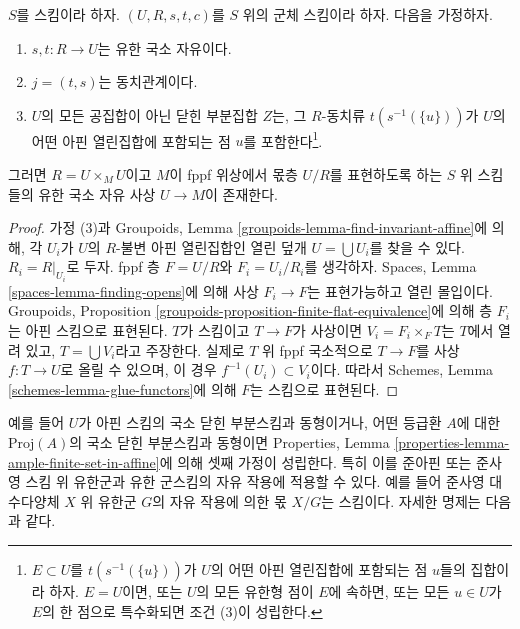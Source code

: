 \begin{proposition}
\label{proposition-finite-flat-equivalence-global}
$S$를 스킴이라 하자.
$(U, R, s, t, c)$를 $S$ 위의 군체 스킴이라 하자.
다음을 가정하자.
\begin{enumerate}
\item $s, t : R \to U$는 유한 국소 자유이다.
\item $j = (t, s)$는 동치관계이다.
\item $U$의 모든 공집합이 아닌 닫힌 부분집합 $Z$는, 그 $R$-동치류
$t(s^{-1}(\{u\}))$가 $U$의 어떤 아핀 열린집합에 포함되는 점 $u$를
포함한다\footnote{$E \subset U$를 $t(s^{-1}(\{u\}))$가 $U$의 어떤
아핀 열린집합에 포함되는 점 $u$들의 집합이라 하자. $E = U$이면,
또는 $U$의 모든 유한형 점이 $E$에 속하면, 또는 모든 $u \in U$가
$E$의 한 점으로 특수화되면 조건 (3)이 성립한다.}.
\end{enumerate}
그러면 $R = U \times_M U$이고 $M$이 fppf 위상에서 몫층 $U/R$를
표현하도록 하는 $S$ 위 스킴들의 유한 국소 자유 사상 $U \to M$이 존재한다.
\end{proposition}

\begin{proof}
가정 (3)과 Groupoids, Lemma
\ref{groupoids-lemma-find-invariant-affine}에 의해, 각 $U_i$가 $U$의
$R$-불변 아핀 열린집합인 열린 덮개 $U = \bigcup U_i$를 찾을 수 있다.
$R_i = R|_{U_i}$로 두자. fppf 층 $F = U/R$와 $F_i = U_i/R_i$를
생각하자. Spaces, Lemma \ref{spaces-lemma-finding-opens}에 의해 사상
$F_i \to F$는 표현가능하고 열린 몰입이다. Groupoids, Proposition
\ref{groupoids-proposition-finite-flat-equivalence}에 의해 층 $F_i$는
아핀 스킴으로 표현된다. $T$가 스킴이고 $T \to F$가 사상이면
$V_i = F_i \times_F T$는 $T$에서 열려 있고, $T = \bigcup V_i$라고
주장한다. 실제로 $T$ 위 fppf 국소적으로 $T \to F$를 사상
$f : T \to U$로 올릴 수 있으며, 이 경우 $f^{-1}(U_i) \subset V_i$이다.
따라서 Schemes, Lemma \ref{schemes-lemma-glue-functors}에 의해 $F$는
스킴으로 표현된다.
\end{proof}

\noindent
예를 들어 $U$가 아핀 스킴의 국소 닫힌 부분스킴과 동형이거나,
어떤 등급환 $A$에 대한 $\text{Proj}(A)$의 국소 닫힌 부분스킴과
동형이면 Properties, Lemma
\ref{properties-lemma-ample-finite-set-in-affine}에 의해 셋째 가정이
성립한다. 특히 이를 준아핀 또는 준사영 스킴 위 유한군과 유한 군스킴의
자유 작용에 적용할 수 있다. 예를 들어 준사영 대수다양체 $X$ 위 유한군
$G$의 자유 작용에 의한 몫 $X/G$는 스킴이다. 자세한 명제는 다음과 같다.

